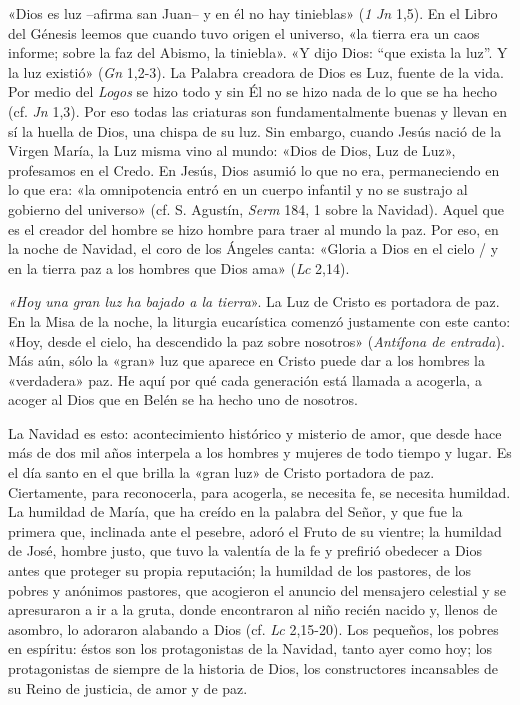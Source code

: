 \documentclass[]{article}
\begin{document}
«Dios es luz --afirma san Juan-- y en él no hay tinieblas» (\emph{1}
\emph{Jn} 1,5). En el Libro del Génesis leemos que cuando tuvo origen el
universo, «la tierra era un caos informe; sobre la faz del Abismo, la
tiniebla». «Y dijo Dios: ``que exista la luz''. Y la luz existió»
(\emph{Gn} 1,2-3). La Palabra creadora de Dios es Luz, fuente de la
vida. Por medio del \emph{Logos} se hizo todo y sin Él no se hizo nada
de lo que se ha hecho (cf. \emph{Jn} 1,3). Por eso todas las criaturas
son fundamentalmente buenas y llevan en sí la huella de Dios, una chispa
de su luz. Sin embargo, cuando Jesús nació de la Virgen María, la Luz
misma vino al mundo: «Dios de Dios, Luz de Luz», profesamos en el Credo.
En Jesús, Dios asumió lo que no era, permaneciendo en lo que era: «la
omnipotencia entró en un cuerpo infantil y no se sustrajo al gobierno
del universo» (cf. S. Agustín, \emph{Serm} 184, 1 sobre la Navidad).
Aquel que es el creador del hombre se hizo hombre para traer al mundo la
paz. Por eso, en la noche de Navidad, el coro de los Ángeles canta:
«Gloria a Dios en el cielo / y en la tierra paz a los hombres que Dios
ama» (\emph{Lc} 2,14).

\emph{«Hoy una gran luz ha bajado a la tierra}». La Luz de Cristo es
portadora de paz. En la Misa de la noche, la liturgia eucarística
comenzó justamente con este canto: «Hoy, desde el cielo, ha descendido
la paz sobre nosotros» (\emph{Antífona de entrada}). Más aún, sólo la
«gran» luz que aparece en Cristo puede dar a los hombres la «verdadera»
paz. He aquí por qué cada generación está llamada a acogerla, a acoger
al Dios que en Belén se ha hecho uno de nosotros.

La Navidad es esto: acontecimiento histórico y misterio de amor, que
desde hace más de dos mil años interpela a los hombres y mujeres de todo
tiempo y lugar. Es el día santo en el que brilla la «gran luz» de Cristo
portadora de paz. Ciertamente, para reconocerla, para acogerla, se
necesita fe, se necesita humildad. La humildad de María, que ha creído
en la palabra del Señor, y que fue la primera que, inclinada ante el
pesebre, adoró el Fruto de su vientre; la humildad de José, hombre
justo, que tuvo la valentía de la fe y prefirió obedecer a Dios antes
que proteger su propia reputación; la humildad de los pastores, de los
pobres y anónimos pastores, que acogieron el anuncio del mensajero
celestial y se apresuraron a ir a la gruta, donde encontraron al niño
recién nacido y, llenos de asombro, lo adoraron alabando a Dios (cf.
\emph{Lc} 2,15-20). Los pequeños, los pobres en espíritu: éstos son los
protagonistas de la Navidad, tanto ayer como hoy; los protagonistas de
siempre de la historia de Dios, los constructores incansables de su
Reino de justicia, de amor y de paz.
\end{document}
